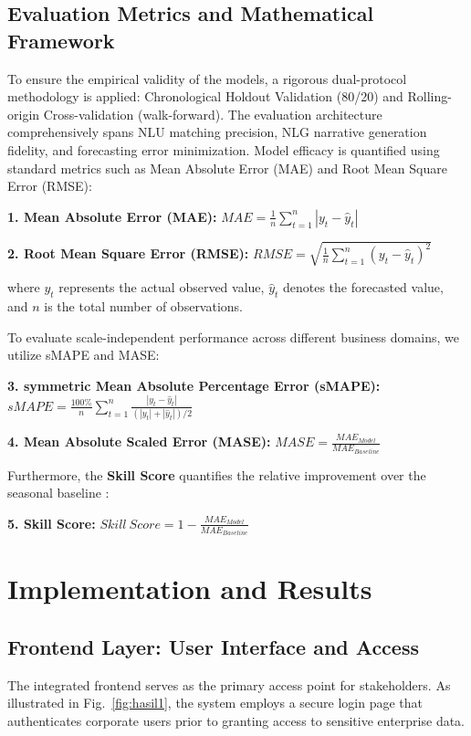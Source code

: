 \documentclass[conference]{IEEEtran}
\begin{document}
\subsection{Evaluation Metrics and Mathematical Framework}
To ensure the empirical validity of the models, a rigorous dual-protocol methodology is applied: Chronological Holdout Validation (80/20) and Rolling-origin Cross-validation (walk-forward). The evaluation architecture comprehensively spans NLU matching precision, NLG narrative generation fidelity, and forecasting error minimization. Model efficacy is quantified using standard metrics such as Mean Absolute Error (MAE) and Root Mean Square Error (RMSE):

\textbf{1. Mean Absolute Error (MAE):} $MAE = \frac{1}{n}\sum_{t=1}^{n}|y_t - \hat{y}_t|$

\textbf{2. Root Mean Square Error (RMSE):} $RMSE = \sqrt{\frac{1}{n}\sum_{t=1}^{n}(y_t - \hat{y}_t)^2}$

where $y_t$ represents the actual observed value, $\hat{y}_t$ denotes the forecasted value, and $n$ is the total number of observations.

To evaluate scale-independent performance across different business domains, we utilize sMAPE and MASE:

\textbf{3. symmetric Mean Absolute Percentage Error (sMAPE):} $sMAPE = \frac{100\%}{n}\sum_{t=1}^{n}\frac{|y_t - \hat{y}_t|}{(|y_t| + |\hat{y}_t|)/2}$

\textbf{4. Mean Absolute Scaled Error (MASE):} $MASE = \frac{MAE_{Model}}{MAE_{Baseline}}$

Furthermore, the \textbf{Skill Score} quantifies the relative improvement over the seasonal baseline \cite{sirisha2022profit}:

\textbf{5. Skill Score:} $Skill\ Score = 1 - \frac{MAE_{Model}}{MAE_{Baseline}}$

\section{Implementation and Results}

\subsection{Frontend Layer: User Interface and Access}
The integrated frontend serves as the primary access point for stakeholders. As illustrated in Fig.~\ref{fig:hasil1}, the system employs a secure login page that authenticates corporate users prior to granting access to sensitive enterprise data. 
\end{document}
